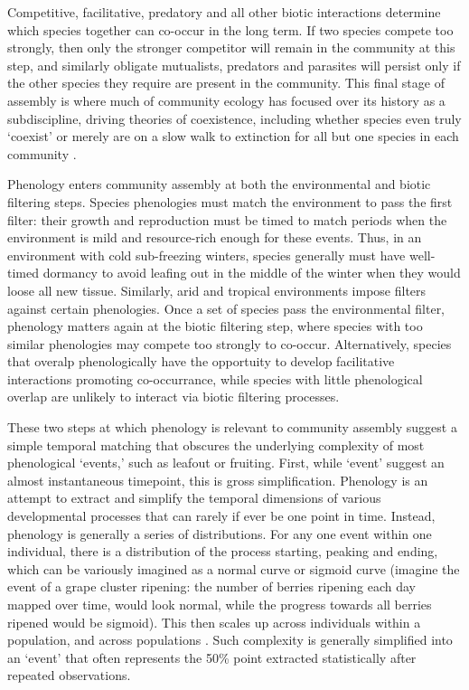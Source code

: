 \documentclass[11pt]{article}
\begin{document}
Competitive, facilitative, predatory and all other biotic interactions determine which species together can co-occur in the long term. If two species compete too strongly, then only the stronger competitor will remain in the community at this step, and similarly obligate mutualists, predators and parasites will persist only if the other species they require are present in the community. This final stage of assembly is where much of community ecology has focused over its history as a subdiscipline, driving theories of coexistence, including whether species even truly `coexist' or merely are on a slow walk to extinction for all but one species in each community \citep{Hubbell:2001vo}. 

Phenology enters community assembly at both the environmental and biotic filtering steps. Species phenologies must match the environment to pass the first filter: their growth and reproduction must be timed to match periods when the environment is mild and resource-rich enough for these events. Thus, in an environment with cold sub-freezing winters, species generally must have well-timed dormancy to avoid leafing out in the middle of the winter when they would loose all new tissue. Similarly, arid and tropical environments impose filters against certain phenologies. Once a set of species pass the environmental filter, phenology matters again at the biotic filtering step, where species with too similar phenologies may compete too strongly to co-occur.  Alternatively, species that overalp phenologically have the opportuity to develop facilitative  interactions \citep{duchenne2021phenological} promoting co-occurrance, while species with little phenological overlap are unlikely to interact via biotic filtering processes.

These two steps at which phenology is relevant to community assembly suggest a simple temporal matching that obscures the underlying complexity of most phenological `events,' such as leafout or fruiting. First, while `event' suggest an almost instantaneous timepoint, this is gross simplification. Phenology is an attempt to extract and simplify the temporal dimensions of various developmental processes that can rarely if ever be one point in time. Instead, phenology is generally a series of distributions. For any one event within one individual, there is a distribution of the process starting, peaking and ending, which can be variously imagined as a normal curve or sigmoid curve (imagine the event of a grape cluster ripening: the number of berries ripening each day mapped over time, would look normal, while the progress towards all berries ripened would be sigmoid). This then scales up across individuals within a population, and across populations \citep{inouye2019}. Such complexity is generally simplified into an `event' that often represents the 50\% point extracted statistically after repeated observations. 
\end{document}
